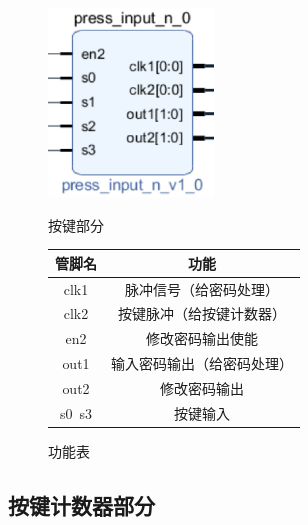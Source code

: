 \documentclass[a4paper,11pt]{ctexart}
\begin{document}
\begin{figure}[htb]
  \begin{minipage}[b]{0.5\textwidth}
    \centering
    \includegraphics[height= 5cm]{./images/p2.eps}
    \caption{按键部分}
    \label{fig:by:table}
  \end{minipage}%
  \begin{minipage}[b]{0.5\textwidth}
    \centering
    \begin{tabular}{|c|c|} \hline
      管脚名 & 功能 \\ \hline\hline
      clk1     &   脉冲信号（给密码处理）\\
      clk2     & 按键脉冲（给按键计数器） \\
      en2      & 修改密码输出使能 \\
      out1     & 输入密码输出（给密码处理） \\
      out2     & 修改密码输出 \\
      s0~s3    & 按键输入 \\ \hline
    \end{tabular}
    \caption{功能表}
    \label{table:by:fig}
  \end{minipage}
\end{figure}

\newpage
\subsection{按键计数器部分}
\end{document}
